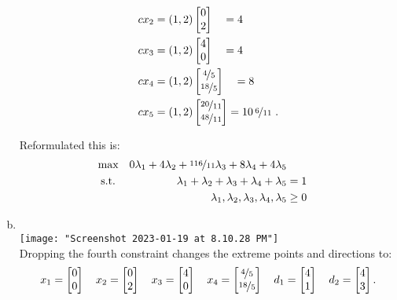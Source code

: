 \documentclass[12pt]{amsart}
\begin{document}
\begin{enumerate}[a.]
\begin{align*}
		cx_2 &= (1,2)\begin{bmatrix} 0 \\ 2 \end{bmatrix} \quad  = 4 \\
		cx_3 &= (1,2)\begin{bmatrix} 4 \\ 0 \end{bmatrix} \quad  = 4 \\
		cx_4 &= (1,2)\begin{bmatrix} \nicefrac{4}{5} \\ \nicefrac{18}{5} \end{bmatrix} \quad = 8 \\
		cx_5 &= (1,2)\begin{bmatrix}\nicefrac{20}{11}\\ \nicefrac{48}{11} \end{bmatrix} = 10 \,\nicefrac{6}{11} \ . 
	\end{align*}

	Reformulated this is:
	\begin{align*}
		\text{max} \quad 0\lambda_1 + 4\lambda_2 + \nicefrac{116}{11}\lambda_3 + 8\lambda_4 + 4\lambda_5 && \\
		\text{s.t.} \hspace{13ex} \lambda_1 + \lambda_2 + \lambda_3 + \lambda_4 + \lambda_5 &= 1 & \\
					\lambda_1, \lambda_2, \lambda_3, \lambda_4, \lambda_5 &\geq 0 & \\
	\end{align*}
	
	\item \phantom{text} \\
	\texttt{[image: "Screenshot 2023-01-19 at 8.10.28 PM"]} \\
	Dropping the fourth constraint changes the extreme points and directions to:
	\begin{align*}
		x_1 = \begin{bmatrix} 0 \\ 0 \end{bmatrix} \quad
		x_2 = \begin{bmatrix} 0 \\ 2 \end{bmatrix} \quad
		x_3 = \begin{bmatrix} 4 \\ 0 \end{bmatrix} \quad
		x_4 = \begin{bmatrix} \nicefrac{4}{5} \\ \nicefrac{18}{5} \end{bmatrix} \quad
		d_1 = \begin{bmatrix} 4 \\ 1 \end{bmatrix} \quad
		d_2 = \begin{bmatrix} 4 \\ 3 \end{bmatrix}.
	\end{align*}


\end{enumerate}
\end{document}
